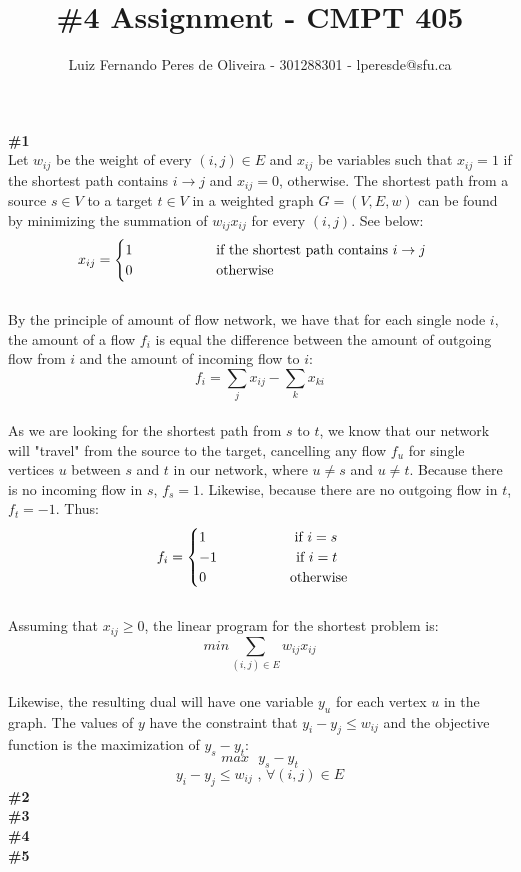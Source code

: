 \documentclass{article}
\title{\#4 Assignment - CMPT 405}
\author{Luiz Fernando Peres de Oliveira - 301288301 - lperesde@sfu.ca}
\newcommand\tab[1][1cm]{\hspace*{#1}}
\begin{document}
\maketitle
\textbf{\#1}
\\
Let $w_{ij}$ be the weight of every $(i, j) \in E$ and $x_{ij}$ be variables such that $x_{ij} = 1$ if the shortest path contains $i \rightarrow j$ and $x_{ij} = 0$, otherwise. The shortest path from a source $s \in V$ to a target $t \in V$ in a weighted graph $G=(V, E, \textit{w})$ can be found by minimizing the summation of $w_{ij}x_{ij}$ for every $(i, j)$. See below:
\begin{gather*}
x_{ij} =
\begin{cases}
1 \tab\tab\text{ if the shortest path contains } i \rightarrow j \\
0 \tab\tab\text{ otherwise}\\
\end{cases}
\end{gather*}
\\
By the principle of amount of flow network, we have that for each single node $i$, the amount of a flow $f_i$ is equal the difference between the amount of outgoing flow from $i$ and the amount of incoming flow to $i$:
$$
f_i = \sum_{j}x_{ij} - \sum_{k} x_{ki}
$$
\\
As we are looking for the shortest path from $s$ to $t$, we know that our network will "travel" from the source to the target, cancelling any flow $f_u$ for single vertices $u$ between $s$ and $t$ in our network, where $u \neq s$ and $u \neq t$. Because there is no incoming flow in $s$, $f_s = 1$. Likewise, because there are no outgoing flow in $t$, $f_t = -1$. Thus:
\begin{gather*}
f_i =
\begin{cases}
1 \text{ } \tab\tab\text{ if } i = s\\
-1 \tab\tab\text{if } i = t\\
0 \tab\tab\text{ otherwise}
\end{cases}
\end{gather*}
\\
Assuming that $x_{ij} \geq 0$, the linear program for the shortest problem is:
$$
min \sum_{(i, j) \in E} w_{ij}x_{ij}
$$
\\
Likewise, the resulting dual will have one variable $y_u$ for each vertex $u$ in the  graph. The values of $y$ have the constraint that $y_i - y_j \leq w_{ij}$ and the objective function is the maximization of $y_s - y_t$:
$$
max \text{ } y_s - y_t
$$
$$
y_i - y_j \leq w_{ij} \text{ , } \forall (i,j) \in E
$$
\textbf{\#2}
\\
\textbf{\#3}
\\
\textbf{\#4}
\\
\textbf{\#5}
\\
\end{document}
